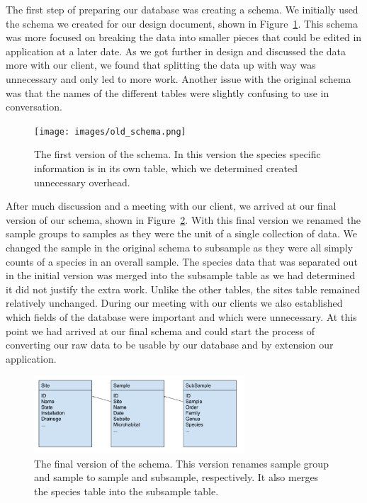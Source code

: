 \documentclass[10pt,draftclsnofoot,onecolumn]{IEEEtran}
\begin{document}
The first step of preparing our database was creating a schema.
We initially used the schema we created for our design document, shown in Figure~\ref{fig:old_schema}.
This schema was more focused on breaking the data into smaller pieces that could be edited in application at a later date.
As we got further in design and discussed the data more with our client, we found that splitting the data up with way was unnecessary and only led to more work.
Another issue with the original schema was that the names of the different tables were slightly confusing to use in conversation.

\begin{figure}[h]
	\centering
	\texttt{[image: images/old\_schema.png]}
	\captionsetup{justification=centering}
	\caption{
		The first version of the schema.
		In this version the species specific information is in its own table, which we determined created unnecessary overhead.
	}
	\label{fig:old_schema}
\end{figure}

After much discussion and a meeting with our client, we arrived at our final version of our schema, shown in Figure~\ref{fig:new_schema}.
With this final version we renamed the sample groups to samples as they were the unit of a single collection of data.
We changed the sample in the original schema to subsample as they were all simply counts of a species in an overall sample.
The species data that was separated out in the initial version was merged into the subsample table as we had determined it did not justify the extra work.
Unlike the other tables, the sites table remained relatively unchanged.
During our meeting with our clients we also established which fields of the database were important and which were unnecessary.
At this point we had arrived at our final schema and could start the process of converting our raw data to be usable by our database and by extension our application.

\begin{figure}[h]
	\centering
	\includegraphics[width=0.70\textwidth]{images/new_schema.png}
	\captionsetup{justification=centering}
	\caption{
		The final version of the schema.
		This version renames sample group and sample to sample and subsample, respectively.
		It also merges the species table into the subsample table.
	}
	\label{fig:new_schema}
\end{figure}
\end{document}
